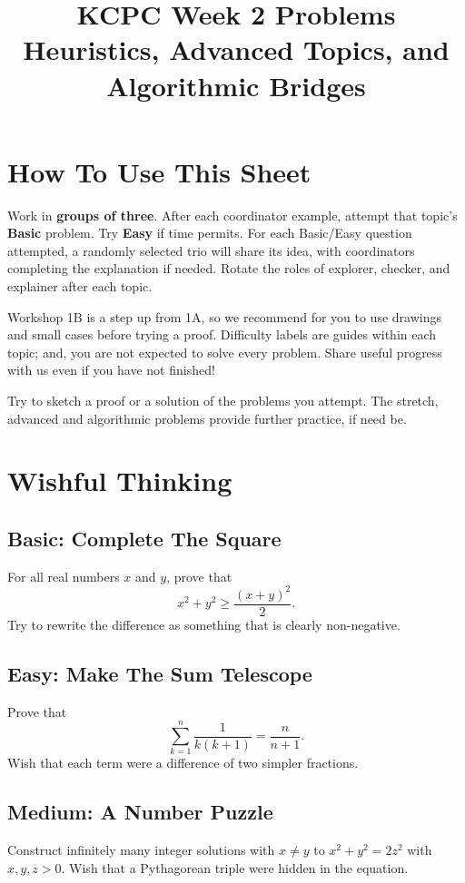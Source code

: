 \documentclass[12pt]{article}
\title{KCPC Week 2 Problems\\Heuristics, Advanced Topics, and
Algorithmic Bridges}
\author{}
\date{}
\begin{document}
\maketitle
\thispagestyle{fancy}

\section*{How To Use This Sheet}
Work in \textbf{groups of three}. After each coordinator example, attempt
that topic's \textbf{Basic} problem. Try \textbf{Easy} if time permits.
For each Basic/Easy question attempted, a randomly selected trio will
share its idea, with coordinators completing the explanation if needed.
Rotate the roles of explorer, checker, and explainer after each topic.

Workshop 1B is a step up from 1A, so we recommend for you to use drawings and small cases before
trying a proof. Difficulty labels are guides within each topic; and, you are
not expected to solve every problem. Share useful progress with us even if you
have not finished!

Try to sketch a proof or a solution of the problems you attempt. The stretch,
advanced and algorithmic problems provide further practice, if need be.

\section{Wishful Thinking}

\subsection*{Basic: Complete The Square}
For all real numbers $x$ and $y$, prove that
\[
x^2+y^2\ge \frac{(x+y)^2}{2}.
\]
Try to rewrite the difference as something that is clearly non-negative.

\subsection*{Easy: Make The Sum Telescope}
Prove that
\[
\sum_{k=1}^{n}\frac{1}{k(k+1)}=\frac{n}{n+1}.
\]
Wish that each term were a difference of two simpler fractions.

\subsection*{Medium: A Number Puzzle}
Construct infinitely many integer solutions with $x\ne y$ to
$x^2+y^2=2z^2$ with $x,y,z>0$. Wish that a Pythagorean triple were
hidden in the equation.
\end{document}
